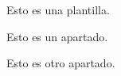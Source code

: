 \problem
Esto es una plantilla.

\subproblem
Esto es un apartado.

\subproblem
Esto es otro apartado.